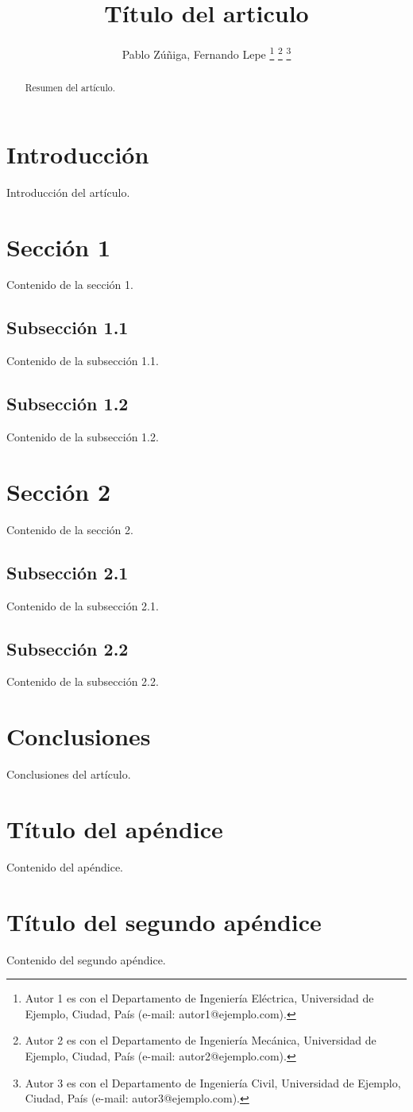 \documentclass[journal]{IEEEtran}
\begin{document}
\title{Título del articulo}

\author{Pablo Zúñiga, Fernando Lepe%
\thanks{Autor 1 es con el Departamento de Ingeniería Eléctrica, Universidad de Ejemplo, Ciudad, País (e-mail: autor1@ejemplo.com).}%
\thanks{Autor 2 es con el Departamento de Ingeniería Mecánica, Universidad de Ejemplo, Ciudad, País (e-mail: autor2@ejemplo.com).}%
\thanks{Autor 3 es con el Departamento de Ingeniería Civil, Universidad de Ejemplo, Ciudad, País (e-mail: autor3@ejemplo.com).}%
}

\maketitle

\begin{abstract}
Resumen del artículo.
\end{abstract}

\section{Introducción}
Introducción del artículo.

\section{Sección 1}
Contenido de la sección 1.

\subsection{Subsección 1.1}
Contenido de la subsección 1.1.

\subsection{Subsección 1.2}
Contenido de la subsección 1.2.

\section{Sección 2}
Contenido de la sección 2.

\subsection{Subsección 2.1}
Contenido de la subsección 2.1.

\subsection{Subsección 2.2}
Contenido de la subsección 2.2.

\section{Conclusiones}
Conclusiones del artículo.

\appendices
\section{Título del apéndice}
Contenido del apéndice.

\section{Título del segundo apéndice}
Contenido del segundo apéndice.
\end{document}
